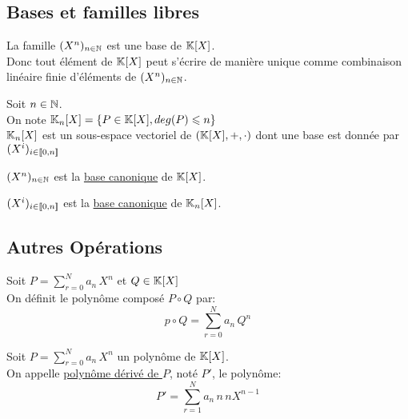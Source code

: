 \documentclass[12pt,twoside,a4paper]{article}
\begin{document}
		\subsection{Bases et familles libres}
			\begin{prop}
				La famille $(X^{n})_{n\in\mathbb{N}}$ est une base de $\mathbb{K}[X]$.\\
				Donc tout élément de $\mathbb{K}[X]$ peut s'écrire de manière unique comme combinaison linéaire finie d'éléments de $(X^{n})_{n\in\mathbb{N}}$.
			\end{prop}
			\begin{prop}
				Soit $n\in\mathbb{N}$.\\
				On note $\mathbb{K}_n[X]=\left\lbrace P\in\mathbb{K}[X],deg(P)\leqslant n\right\rbrace$\\
				$\mathbb{K}_n[X]$ est un sous-espace vectoriel de $(\mathbb{K}[X],+,\cdot)$ dont une base est donnée par $(X^{i})_{i\in[\![0,n]\!]}$
			\end{prop}
			\begin{defi}
				\begin{liste}
					\item $(X^{n})_{n\in\mathbb{N}}$ est la \underline{base canonique} de $\mathbb{K}[X]$.
					\item $(X^{i})_{i\in[\![0,n]\!]}$ est la \underline{base canonique} de $\mathbb{K}_n[X]$.
				\end{liste}
			\end{defi}
			
			
		\subsection{Autres Opérations}
			\begin{defi}
				Soit $P=\sum\limits_{r=0}^Na_n\,X^{n}$ et $Q\in\mathbb{K}[X]$\\
				On définit le polynôme composé $P\circ Q$ par:
				$$p\circ Q=\sum\limits_{r=0}^Na_n\,Q^{n}$$
			\end{defi}
			\begin{defi}
				Soit $P=\sum\limits_{r=0}^Na_n\,X^{n}$ un polynôme de $\mathbb{K}[X]$.\\
				On appelle \underline{polynôme dérivé de $P$}, noté $P'$, le polynôme:
				$$P'=\sum\limits_{r=1}^Na_n\,n\,nX^{n-1} $$
			\end{defi}
\end{document}
